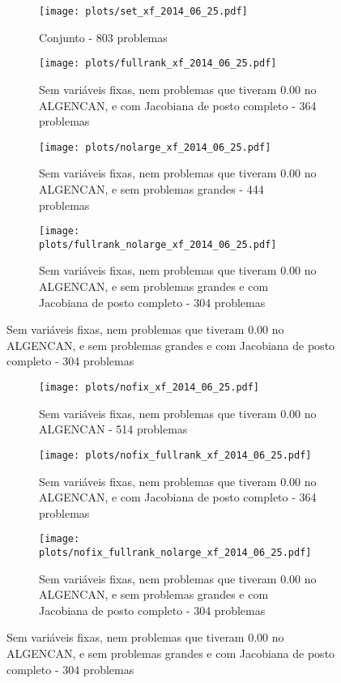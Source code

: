 \documentclass{article}
\begin{document}
\begin{figure}[H]
  \centering
  \begin{subfigure}{0.48\textwidth}
    \texttt{[image: plots/set\_xf\_2014\_06\_25.pdf]}
    \caption{Conjunto - 803 problemas}
  \end{subfigure}
  \begin{subfigure}{0.48\textwidth}
    \texttt{[image: plots/fullrank\_xf\_2014\_06\_25.pdf]}
    \caption{Sem variáveis fixas, nem problemas
      que tiveram 0.00 no ALGENCAN, e com Jacobiana de posto completo - 364
      problemas}
  \end{subfigure}
  \begin{subfigure}{0.48\textwidth}
    \texttt{[image: plots/nolarge\_xf\_2014\_06\_25.pdf]}
    \caption{Sem variáveis fixas, nem problemas
      que tiveram 0.00 no ALGENCAN, e sem problemas grandes - 444 problemas}
  \end{subfigure}
  \begin{subfigure}{0.48\textwidth}
    \texttt{[image: plots/fullrank\_nolarge\_xf\_2014\_06\_25.pdf]}
    \caption{Sem variáveis fixas, nem problemas
      que tiveram 0.00 no ALGENCAN, e sem problemas grandes e com Jacobiana de
      posto completo - 304 problemas}
  \end{subfigure}
\end{figure}
\begin{figure}[H]
  \centering
  \begin{subfigure}{0.48\textwidth}
    \texttt{[image: plots/nofix\_xf\_2014\_06\_25.pdf]}
    \caption{Sem variáveis fixas, nem problemas
      que tiveram 0.00 no ALGENCAN - 514 problemas}
  \end{subfigure}
  \begin{subfigure}{0.48\textwidth}
    \texttt{[image: plots/nofix\_fullrank\_xf\_2014\_06\_25.pdf]}
    \caption{Sem variáveis fixas, nem problemas
      que tiveram 0.00 no ALGENCAN, e com Jacobiana de posto completo - 364
      problemas}
  \end{subfigure}
  \begin{subfigure}{0.48\textwidth}
    \texttt{[image: plots/nofix\_fullrank\_nolarge\_xf\_2014\_06\_25.pdf]}
    \caption{Sem variáveis fixas, nem problemas
      que tiveram 0.00 no ALGENCAN, e sem problemas grandes e com Jacobiana de
      posto completo - 304 problemas}
  \end{subfigure}
\end{figure}
\end{document}
